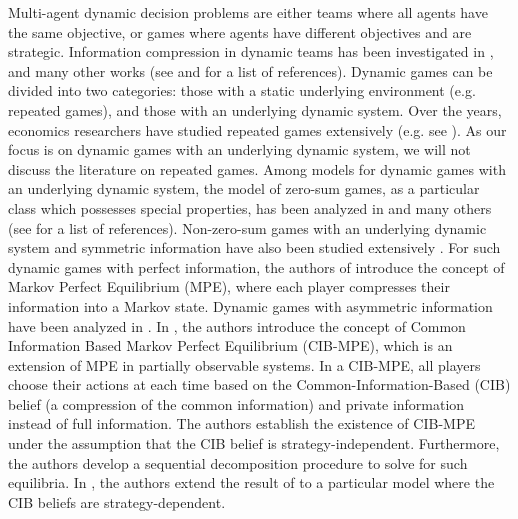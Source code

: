 \documentclass[pdflatex,sn-basic]{sn-jnl}
\theoremstyle{thmstyleone}%
\theoremstyle{thmstyletwo}%
\theoremstyle{thmstylethree}%
\begin{document}
{Multi-agent dynamic decision problems are either teams where all agents have the same objective, or games where agents have different objectives and are strategic. Information compression in dynamic teams has been investigated in  \cite{varaiya1978delayed,nayyar2010optimal,nayyar2013decentralized,mahajan2016decentralized,tavafoghi2021unified,subramanian2020approximate,kao2022common}, and many other works (see \cite{tavafoghi2021unified} and \cite{subramanian2020approximate} for a list of references).} 
Dynamic games can be divided into two categories: those with a static underlying environment (e.g. repeated games), and those with an underlying dynamic system. Over the years, economics researchers have studied repeated games extensively (e.g. see \cite[Chapter 7]{myerson2013game}). As our focus is on dynamic games with an underlying dynamic system, we will not discuss {the literature on repeated games}. Among models for dynamic games with an underlying dynamic system, the model of zero-sum games, as a particular class which possesses special properties, has been analyzed in  \cite{shapley1953stochastic,mertens1981stochastic,rosenberg1998duality} and many others (see \cite{ouyang2024approach} for a list of references). 
{Non-zero-sum} games with an underlying dynamic system and symmetric information have also been studied extensively \citep{bacsar1998dynamic,filar2012competitive}. For such dynamic games with perfect information, the authors of \cite{maskin2001markov} introduce the concept of Markov Perfect Equilibrium (MPE), where each player compresses their information into a Markov state. Dynamic games with asymmetric information {have been} analyzed in \cite{mertens2003equilibria,maskin2013youtube,nayyar2012dynamic,nayyar2013common,gupta2014common,gupta2016dynamic,ouyang2015oligopoly,ouyang2016dynamic,tavafoghi2016stochastic,hamidthesis,vasal2019spbe,tang2022dynamic,ouyang2024approach}.
In \cite{nayyar2013common}, the authors introduce the concept of Common Information Based Markov Perfect Equilibrium (CIB-MPE), which is an extension of MPE in partially observable systems. In a CIB-MPE, all players choose their actions at each time based on the {Common-Information-Based (CIB)} belief {(a compression of the common information)} and private information instead of full information. The authors establish the existence of CIB-MPE under the assumption that the CIB belief is strategy-independent. Furthermore, the authors develop a sequential decomposition procedure to solve for such equilibria. In \cite{ouyang2016dynamic}, the authors extend the result of \cite{nayyar2013common} to a particular model where the CIB beliefs are strategy-dependent. 
\end{document}
